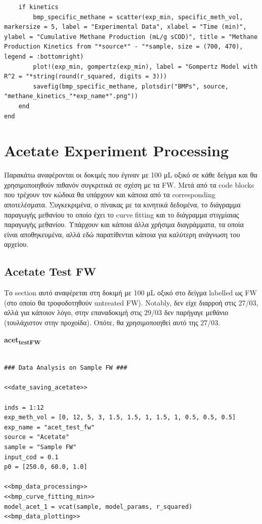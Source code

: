 \documentclass[11pt]{article}
\begin{document}
\begin{verbatim}
    if kinetics
        bmp_specific_methane = scatter(exp_min, specific_meth_vol, markersize = 5, label = "Experimental Data", xlabel = "Time (min)", ylabel = "Cumulative Methane Production (mL/g sCOD)", title = "Methane Production Kinetics from "*source*" - "*sample, size = (700, 470), legend = :bottomright)
        plot!(exp_min, gompertz(exp_min), label = "Gompertz Model with R^2 = "*string(round(r_squared, digits = 3)))
        savefig(bmp_specific_methane, plotsdir("BMPs", source, "methane_kinetics_"*exp_name*".png"))
    end
end

\end{verbatim}

\section{Acetate Experiment Processing}
\label{sec:org5c1830d}
Παρακάτω αναφέρονται οι δοκιμές που έγιναν με 100 μL οξικό σε κάθε δείγμα και θα χρησιμοποιηθούν πιθανόν συγκριτικά σε σχέση με τα FW. Μετά από τα code blocks που τρέχουν τον κώδικα θα υπάρχουν και κάποια από τα corresponding αποτελέσματα. Συγκεκριμένα, ο πίνακας με τα κινητικά δεδομένα, το διάγραμμα παραγωγής μεθανίου το οποίο έχει το curve fitting και το διάγραμμα στιγμίαιας παραγωγής μεθανίου. Υπάρχουν και κάποια άλλα χρήσιμα διαγράμματα, τα οποία είναι αποθηκευμένα, αλλά εδώ παρατίθενται κάποια για καλύτερη ανάγνωση του αρχείου.

\subsection{Acetate Test FW}
\label{sec:orga28266d}
Το section αυτό αναφέρεται στη δοκιμή με 100 μL οξικό στο δείγμα labelled ως FW (στο οποίο θα τροφοδοτηθούν untreated FW). Notably, δεν είχε διαρροή στις 27/03, αλλά για κάποιον λόγο, στην επαναδοκιμή στις 29/03 δεν παρήγαγε μεθάνιο (τουλάχιστον στην προχοίδα). Οπότε, θα χρησιμοποιηθεί αυτό της 27/03.

\textbf{acet\textsubscript{test}\textsubscript{FW}}
\begin{verbatim}

### Data Analysis on Sample FW ###

<<date_saving_acetate>>

inds = 1:12
exp_meth_vol = [0, 12, 5, 3, 1.5, 1.5, 1, 1.5, 1, 0.5, 0.5, 0.5]
exp_name = "acet_test_fw"
source = "Acetate"
sample = "Sample FW"
input_cod = 0.1
p0 = [250.0, 60.0, 1.0]

<<bmp_data_processing>>
<<bmp_curve_fitting_min>>
model_acet_1 = vcat(sample, model_params, r_squared)
<<bmp_data_plotting>>
\end{verbatim}
\end{document}
